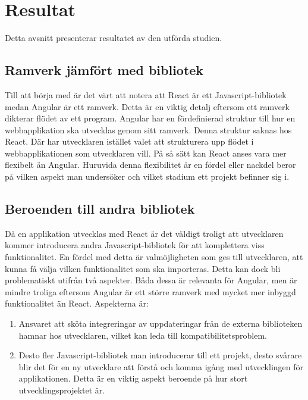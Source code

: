 \section{Resultat}
\label{sec:axel-results}
Detta avsnitt presenterar resultatet av den utförda studien.

\subsection{Ramverk jämfört med bibliotek}
Till att börja med är det värt att notera att React är ett Javascript-bibliotek medan Angular är ett ramverk. Detta är en viktig detalj eftersom ett ramverk dikterar flödet av ett program. \cite[Avsnitt 2.4]{medium} Angular har en fördefinierad struktur till hur en webbapplikation ska utvecklas genom sitt ramverk. Denna struktur saknas hos React. Där har utvecklaren istället valet att strukturera upp flödet i webbapplikationen som utvecklaren vill. På så sätt kan React anses vara mer flexibelt än Angular. Huruvida denna flexibilitet är en fördel eller nackdel beror på vilken aspekt man undersöker och vilket stadium ett projekt befinner sig i. 

\subsection{Beroenden till andra bibliotek}
\label{beroenden-till-andra-bibliotek}
Då en applikation utvecklas med React är det väldigt troligt att utvecklaren kommer introducera andra Javascript-bibliotek för att komplettera viss funktionalitet. \cite[Features]{sitepoint} En fördel med detta är valmöjligheten som ges till utvecklaren, att kunna få välja vilken funktionalitet som ska importeras. Detta kan dock bli problematiskt utifrån två aspekter. Båda dessa är relevanta för Angular, men är mindre troliga eftersom Angular är ett större ramverk med mycket mer inbyggd funktionalitet än React. Aspekterna är:

\begin{enumerate}
    \item Ansvaret att sköta integreringar av uppdateringar från de externa biblioteken hamnar hos utvecklaren, vilket kan leda till kompatibilitetsproblem.

    \item Desto fler Javascript-bibliotek man introducerar till ett projekt, desto svårare blir det för en ny utvecklare att förstå och komma igång med utvecklingen för applikationen. Detta är en viktig aspekt beroende på hur stort utvecklingsprojektet är.
\end{enumerate}



